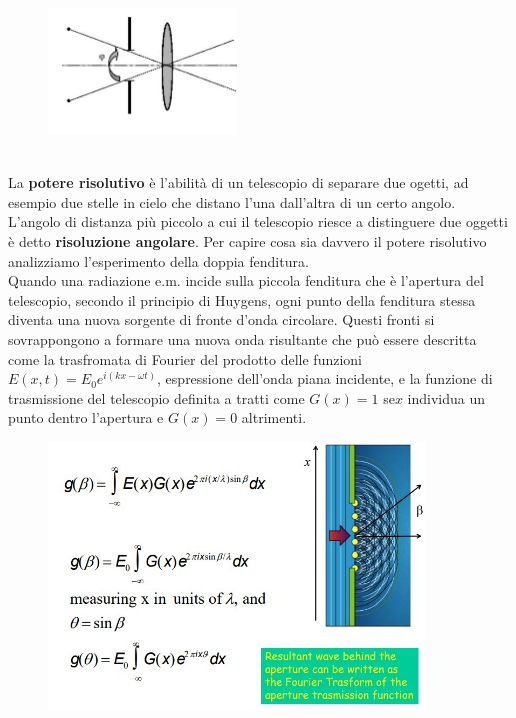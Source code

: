 \documentclass[a4paper,11pt]{article}
\begin{document}
 \begin{figure}[h!!]
    \centering
    \includegraphics[width=5cm]{WhatsApp Image 2023-01-09 at 02.51.58.jpeg}
    \label{fig:my_label7}
\end{figure}\\
La \textbf{potere risolutivo} è l'abilità di un telescopio di separare due ogetti, ad esempio due stelle in cielo che distano l'una dall'altra di un certo angolo. L'angolo di distanza più piccolo a cui il telescopio riesce a distinguere due oggetti è detto \textbf{risoluzione angolare}.
Per capire cosa sia davvero il potere risolutivo analizziamo l'esperimento della doppia fenditura.\\
Quando una radiazione e.m. incide sulla piccola fenditura che è l'apertura del telescopio, secondo il principio di Huygens, ogni punto della fenditura stessa diventa una nuova sorgente di fronte d'onda circolare. Questi fronti si sovrappongono a formare una nuova onda risultante che può essere descritta come la trasfromata di Fourier del prodotto delle funzioni \(E(x,t) = E_0e^{i(kx-\omega t)}\), espressione dell'onda piana incidente, e la funzione di trasmissione del telescopio definita a tratti come \(G(x) = 1 \) se\(x\) individua un punto dentro l'apertura e \(G(x) = 0 \) altrimenti. 
\begin{figure}[h!!]
    \centering
    \includegraphics[width=10cm]{WhatsApp Image 2023-01-09 at 02.55.01.jpeg}
    \label{fig:my_label8}
\end{figure}\\
\end{document}
